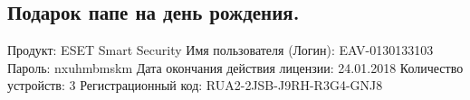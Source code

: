\documentclass[utf8, combine, sts, 14pt, a4paper,oneside,fleqn]{extarticle}
\begin{document}
    \begin{onehalfspacing}

        \section{Подарок папе на день рождения.}

Продукт: ESET Smart Security
Имя пользователя (Логин): EAV-0130133103
Пароль: nxuhmbmskm
Дата окончания действия лицензии: 24.01.2018
Количество устройств: 3
Регистрационный код: RUA2-2JSB-J9RH-R3G4-GNJ8



    \end{onehalfspacing}
\end{document}
